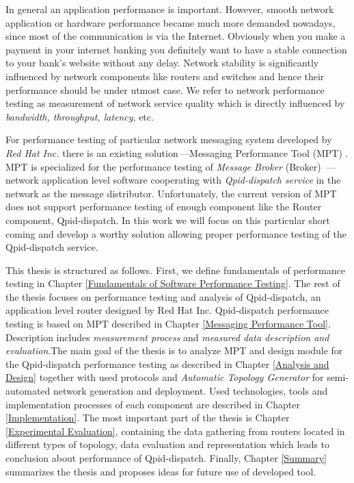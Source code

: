 In general an application performance is important. However, smooth network application or hardware performance became much more demanded nowadays, since most of the communication is via the Internet.  Obviously when you make a payment in your internet banking you definitely want to have a stable connection to your bank's website without any delay. Network stability is significantly influenced by network components like routers and switches and hence their performance should be under utmost case. We refer to network performance testing as measurement of network service quality which is directly influenced by \emph{bandwidth, throughput, latency}, etc. 

For performance testing of particular network messaging system developed by \emph{Red Hat Inc.} there is an existing solution\,---Messaging Performance Tool (MPT) \cite{ORPISKE:MSGPT}. MPT is specialized for the performance testing of \emph{Message Broker} (Broker) \cite{RH:Broker}\,---\,network application level software cooperating with \emph{Qpid-dispatch service} \cite{RH:Interconnect} in the network as the message distributor. Unfortunately, the current version of MPT does not support performance testing of enough component like the Router component, Qpid-dispatch. In this work we will focus on this particular short coming and develop a worthy solution allowing proper performance testing of the Qpid-dispatch service.

This thesis is structured as follows. First, we define fundamentals of performance testing in Chapter \ref{Fundamentals of Software Performance Testing}. The rest of the thesis focuses on performance testing and analysis of Qpid-dispatch, an application level router designed by Red Hat Inc. Qpid-dispatch performance testing is based on MPT described in Chapter \ref{Messaging Performance Tool}. Description includes \emph{measurement process} and \emph{measured data description and evaluation}.The main goal of the thesis is to analyze MPT and design module for the Qpid-dispatch performance testing as described in Chapter \ref{Analysis and Design} together with used protocols and \emph{Automatic Topology Generator} for semi-automated network generation and deployment. Used technologies, tools and  implementation processes of each component are described in Chapter \ref{Implementation}. The most important part of the thesis is Chapter \ref{Experimental Evaluation}, containing the data gathering  from routers located in different types of topology, data evaluation and representation which leads to conclusion about performance of Qpid-dispatch. Finally, Chapter \ref{Summary} summarizes the thesis and proposes ideas for future use of developed tool.

